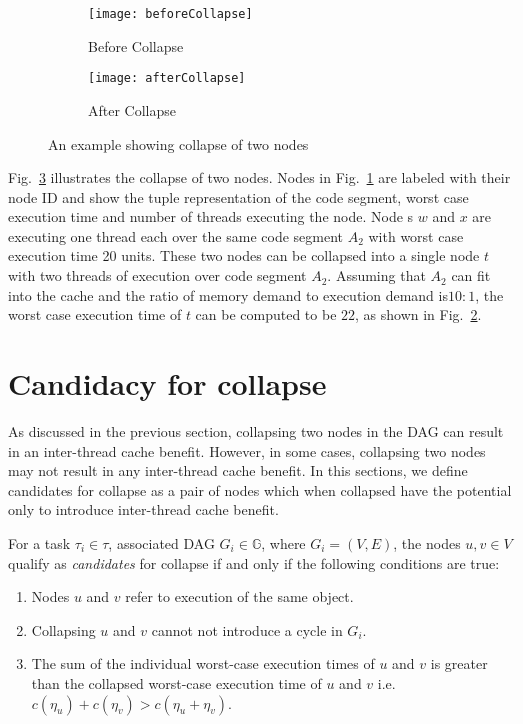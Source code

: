 \begin{figure}
  \centering
  \begin{subfigure}[b]{0.4\textwidth}{
      \texttt{[image: beforeCollapse]}
      \caption{Before Collapse}
      \label{fig:before-collapse}
    }
  \end{subfigure} \quad
  \begin{subfigure}[b]{0.4\textwidth}{
      \texttt{[image: afterCollapse]}
      \caption{After Collapse}
      \label{fig:after-collapse}
    }
  \end{subfigure}
  \caption{An example showing collapse of two nodes}
  \label{fig:dag-collapse}
\end{figure}

Fig.~\ref{fig:dag-collapse} illustrates the collapse of two nodes. Nodes in
Fig.~\ref{fig:before-collapse} are labeled with their node ID and show the tuple representation of the code segment, worst case execution time and number of threads executing the node. Node s $w$ and $x$ are executing one thread each over the same code segment $A_2$ with worst case execution time 20 units. These two nodes can be collapsed into a single node $t$ with two threads of execution over code segment $A_2$. Assuming that $A_2$ can fit into the cache and the ratio of memory demand to execution demand is$10:1$, the worst case execution time of $t$ can be computed to be $22$, as shown in
Fig.~\ref{fig:after-collapse}.

  





\section{Candidacy for collapse}
As discussed in the previous section, collapsing two nodes in the DAG can result in an inter-thread cache benefit. However, in some cases, collapsing two nodes may not result in any inter-thread cache benefit. In this sections, we define candidates for collapse as a pair of nodes which when collapsed have the potential only to introduce inter-thread cache benefit. 

For a task ${\tau_i \in \tau}$, associated DAG ${G_i \in \mathbb{G}}$,
where ${G_i = (V, E)}$, the nodes ${u,v \in V}$ qualify as
\emph{candidates} for collapse if and only if the following conditions
are true: 
\begin{enumerate}
  \item Nodes ${u}$ and ${v}$ refer to execution of the same object.
  \item Collapsing ${u}$ and ${v}$ cannot not introduce a cycle in ${G_i}$.
  \item The sum of the individual worst-case execution times of ${u}$
    and ${v}$ is greater than the collapsed worst-case execution time
    of ${u}$ and ${v}$ i.e. ${c(\eta_u) + c(\eta_v) > c(\eta_u + \eta_v)}$.
\end{enumerate}

